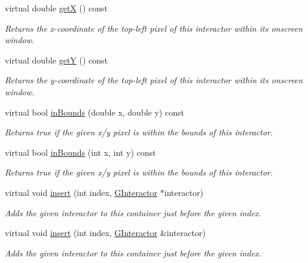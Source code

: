 \begin{DoxyCompactItemize}
virtual double \mbox{\hyperlink{classGInteractor_a344385751bee0720059403940d57a13e}{getX}} () const
\begin{DoxyCompactList}\small\item\em Returns the x-\/coordinate of the top-\/left pixel of this interactor within its onscreen window. \end{DoxyCompactList}\item 
virtual double \mbox{\hyperlink{classGInteractor_aafa51c7f8f38a09febbb9ce7853f77b4}{getY}} () const
\begin{DoxyCompactList}\small\item\em Returns the y-\/coordinate of the top-\/left pixel of this interactor within its onscreen window. \end{DoxyCompactList}\item 
virtual bool \mbox{\hyperlink{classGInteractor_afc480f652b8c5f1fb255e2269ce68879}{in\+Bounds}} (double x, double y) const
\begin{DoxyCompactList}\small\item\em Returns true if the given x/y pixel is within the bounds of this interactor. \end{DoxyCompactList}\item 
virtual bool \mbox{\hyperlink{classGInteractor_ae6d7982c1c627b677a5e776ca86118ed}{in\+Bounds}} (int x, int y) const
\begin{DoxyCompactList}\small\item\em Returns true if the given x/y pixel is within the bounds of this interactor. \end{DoxyCompactList}\item 
virtual void \mbox{\hyperlink{classGContainer_afffb8f789ff9a8466fbae5b846a0ebe7}{insert}} (int index, \mbox{\hyperlink{classGInteractor}{G\+Interactor}} $\ast$interactor)
\begin{DoxyCompactList}\small\item\em Adds the given interactor to this container just before the given index. \end{DoxyCompactList}\item 
virtual void \mbox{\hyperlink{classGContainer_a2e9d7c6d9e6769d4cfd3293afe7e215c}{insert}} (int index, \mbox{\hyperlink{classGInteractor}{G\+Interactor}} \&interactor)
\begin{DoxyCompactList}\small\item\em Adds the given interactor to this container just before the given index. \end{DoxyCompactList}\item 

\end{DoxyCompactItemize}

